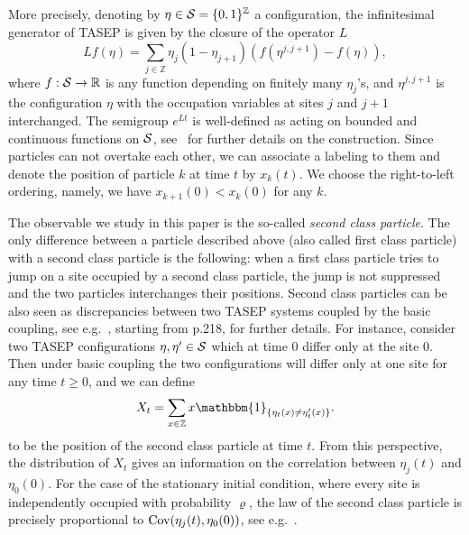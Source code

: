 \documentclass[12pt,a4paper]{article}
\numberwithin{equation}{section}
\newcommand{\R}{\mathbb{R}}
\newcommand{\Z}{\mathbb{Z}}
\begin{document}
More precisely, denoting by $\eta\in {\cal S}=\{0,1\}^\Z$ a configuration, the infinitesimal generator of TASEP is given by the closure of the operator $L$
\begin{equation}
L f(\eta)=\sum_{j\in\Z}\eta_j (1-\eta_{j+1})(f(\eta^{j,j+1})-f(\eta)),
\end{equation}
where $f:{\cal S}\to\R$ is any function depending on finitely many $\eta_j$'s, and $\eta^{j,j+1}$ is the configuration $\eta$ with the occupation variables at sites $j$ and $j+1$ interchanged. The semigroup $e^{L t}$ is well-defined as acting on bounded and continuous functions on ${\cal S}$, see~\cite{Li85b} for further details on the construction. Since particles can not overtake each other, we can associate a labeling to them and denote the position of particle $k$ at time $t$ by $x_k(t)$. We choose the right-to-left ordering, namely, we have $x_{k+1}(0)< x_k(0)$ for any $k$.

The observable we study in this paper is the so-called \emph{second class particle}. The only difference between a particle described above (also called first class particle) with a second class particle is the following: when a first class particle tries to jump on a site occupied by a second class particle, the jump is not suppressed and the two particles interchanges their positions. Second class particles can be also seen as discrepancies between two TASEP systems coupled by the basic coupling, see e.g.~\cite{Li99}, starting from p.218, for further  details. For instance, consider two TASEP configurations $\eta, \eta^{\prime}\in {\cal S}$ which at time $0$ differ only  at the site $0$. Then under basic coupling the two configurations will differ only at one site for any time $t\geq 0$, and we can define
\begin{equation}\label{def2ndclass}
X_t= \sum_{x \in \Z}x \mathbbm{1}_{\{\eta_t (x) \neq \eta^{\prime}_t (x)\}}.
\end{equation}
to be the position of the second class particle at time $t$.
 From this perspective, the distribution of $X_t$ gives an information on the correlation between $\eta_j(t)$ and $\eta_0(0)$. For the case of the stationary initial condition, where every site is independently occupied with probability $\varrho$, the law of the second class particle is precisely proportional to ${\rm Cov}(\eta_j(t),\eta_0(0))$, see e.g.~\cite{PS01}.
\end{document}
